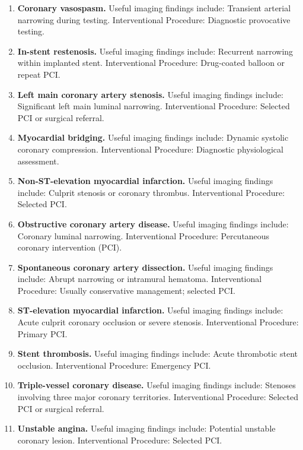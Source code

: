\begin{enumerate}[leftmargin=*,itemsep=0.45em,topsep=0.4em]
\item \textbf{Coronary vasospasm.} Useful imaging findings include: Transient arterial narrowing during testing. Interventional Procedure: Diagnostic provocative testing.
\item \textbf{In-stent restenosis.} Useful imaging findings include: Recurrent narrowing within implanted stent. Interventional Procedure: Drug-coated balloon or repeat PCI.
\item \textbf{Left main coronary artery stenosis.} Useful imaging findings include: Significant left main luminal narrowing. Interventional Procedure: Selected PCI or surgical referral.
\item \textbf{Myocardial bridging.} Useful imaging findings include: Dynamic systolic coronary compression. Interventional Procedure: Diagnostic physiological assessment.
\item \textbf{Non-ST-elevation myocardial infarction.} Useful imaging findings include: Culprit stenosis or coronary thrombus. Interventional Procedure: Selected PCI.
\item \textbf{Obstructive coronary artery disease.} Useful imaging findings include: Coronary luminal narrowing. Interventional Procedure: Percutaneous coronary intervention (PCI).
\item \textbf{Spontaneous coronary artery dissection.} Useful imaging findings include: Abrupt narrowing or intramural hematoma. Interventional Procedure: Usually conservative management; selected PCI.
\item \textbf{ST-elevation myocardial infarction.} Useful imaging findings include: Acute culprit coronary occlusion or severe stenosis. Interventional Procedure: Primary PCI.
\item \textbf{Stent thrombosis.} Useful imaging findings include: Acute thrombotic stent occlusion. Interventional Procedure: Emergency PCI.
\item \textbf{Triple-vessel coronary disease.} Useful imaging findings include: Stenoses involving three major coronary territories. Interventional Procedure: Selected PCI or surgical referral.
\item \textbf{Unstable angina.} Useful imaging findings include: Potential unstable coronary lesion. Interventional Procedure: Selected PCI.
\end{enumerate}

